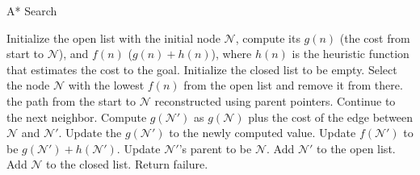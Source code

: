 \documentclass[a4paper,UKenglish,cleveref, autoref, thm-restate]{qlinhta}
\begin{document}
\begin{algorithm}[H]
\caption{A* Search}\label{alg:astar_search}
\begin{algorithmic}[1]
\State Initialize the open list with the initial node $\mathcal{N}$, compute its $g(n)$ (the cost from start to $\mathcal{N}$), and $f(n)$ ($g(n) + h(n)$), where $h(n)$ is the heuristic function that estimates the cost to the goal.
\State Initialize the closed list to be empty.
\State Select the node $\mathcal{N}$ with the lowest $f(n)$ from the open list and remove it from there.
\Return the path from the start to $\mathcal{N}$ reconstructed using parent pointers.
\EndIf
{}
\State Continue to the next neighbor.
\EndIf
\State Compute $g(\mathcal{N'})$ as $g(\mathcal{N})$ plus the cost of the edge between $\mathcal{N}$ and $\mathcal{N'}$.
\State Update the $g(\mathcal{N'})$ to the newly computed value.
\State Update $f(\mathcal{N'})$ to be $g(\mathcal{N'}) + h(\mathcal{N'})$.
\State Update $\mathcal{N'}$'s parent to be $\mathcal{N}$.
\State Add $\mathcal{N'}$ to the open list.
\EndIf
\EndIf
\EndFor
\State Add $\mathcal{N}$ to the closed list.
\EndWhile
{}
\State Return failure.
\EndIf
\EndFunction
\end{algorithmic}
\end{algorithm}
\end{document}
